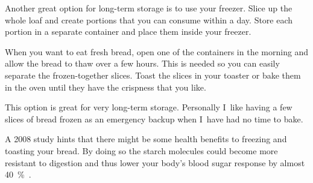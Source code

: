 Another great option for long-term storage is to use
your freezer. Slice up the whole loaf and create portions
that you can consume within a day. Store each portion
in a separate container and place them inside your
freezer.

When you want to eat fresh bread, open one of the containers
in the morning and allow the bread to thaw over a few
hours. This is needed so you can easily separate the frozen-together
slices. Toast the slices in your toaster
or bake them in the oven until they have the crispness
that you like.

This option is great for very long-term storage. Personally
I~like having a few slices of bread frozen as an emergency
backup when I~have had no time to bake.

A 2008 study hints that there might be some health benefits to freezing and
toasting your bread. By doing so the starch molecules could become more
resistant to digestion and thus lower your body's blood sugar response by
almost \qty{40}{\percent}~\cite{freezing+toasting+bread}.
